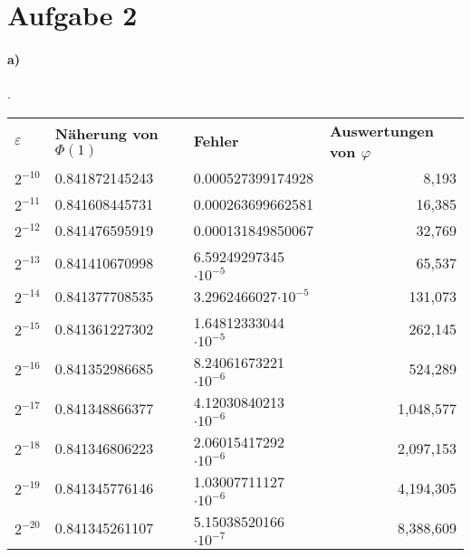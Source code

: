 \documentclass{article}
\begin{document}
	
	
	\section*{Aufgabe 2}
		\paragraph*{a)}.
			\begin{table}[h]
				\begin{tabular}{lllr}
					\textbf{$\varepsilon$} & \textbf{Näherung von $\Phi(1)$} & \textbf{Fehler}   & \multicolumn{1}{l}{\textbf{Auswertungen von $\varphi$}} \\
					$2^{-10}$            & 0.841872145243                & 0.000527399174928 & 8,193                                                 \\
					$2^{-11}$            & 0.841608445731                & 0.000263699662581 & 16,385                                                \\
					$2^{-12}$            & 0.841476595919                & 0.000131849850067 & 32,769                                                \\
					$2^{-13}$            & 0.841410670998                & 6.59249297345$\cdot 10^{-5}$ & 65,537                                                \\
					$2^{-14}$            & 0.841377708535                & 3.2962466027$\cdot 10^{-5}$  & 131,073                                               \\
					$2^{-15}$            & 0.841361227302                & 1.64812333044$\cdot 10^{-5}$ & 262,145                                               \\
					$2^{-16}$            & 0.841352986685                & 8.24061673221$\cdot 10^{-6}$ & 524,289                                               \\
					$2^{-17}$            & 0.841348866377                & 4.12030840213$\cdot 10^{-6}$ & 1,048,577                                             \\
					$2^{-18}$            & 0.841346806223                & 2.06015417292$\cdot 10^{-6}$ & 2,097,153                                             \\
					$2^{-19}$            & 0.841345776146                & 1.03007711127$\cdot 10^{-6}$ & 4,194,305                                             \\
					$2^{-20}$            & 0.841345261107                & 5.15038520166$\cdot 10^{-7}$ & 8,388,609                                             \\

\end{tabular}
\end{table}
\end{document}
